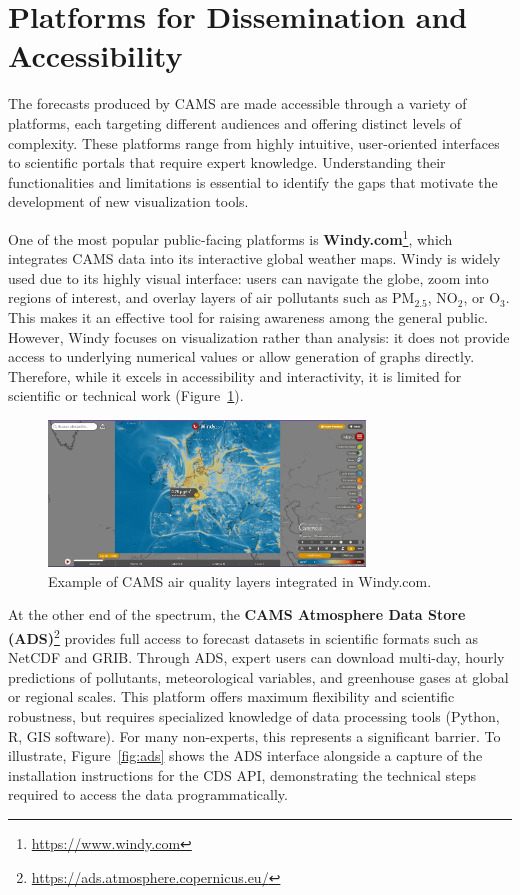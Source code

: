 \section{Platforms for Dissemination and Accessibility}

The forecasts produced by CAMS are made accessible through a variety of platforms, each targeting different audiences and offering distinct levels of complexity. These platforms range from highly intuitive, user-oriented interfaces to scientific portals that require expert knowledge. Understanding their functionalities and limitations is essential to identify the gaps that motivate the development of new visualization tools.

One of the most popular public-facing platforms is \textbf{Windy.com}\footnote{\href{https://www.windy.com}{https://www.windy.com}}, which integrates CAMS data into its interactive global weather maps. Windy is widely used due to its highly visual interface: users can navigate the globe, zoom into regions of interest, and overlay layers of air pollutants such as PM$_{2.5}$, NO$_2$, or O$_3$. This makes it an effective tool for raising awareness among the general public. However, Windy focuses on visualization rather than analysis: it does not provide access to underlying numerical values or allow generation of graphs directly. Therefore, while it excels in accessibility and interactivity, it is limited for scientific or technical work (Figure~\ref{fig:windy}).

\begin{figure}[h!btp]
	\centering
	\includegraphics[width=0.75\textwidth]{fig/windy-example.png}
	\caption[Windy.com interface]{Example of CAMS air quality layers integrated in Windy.com.}
	\label{fig:windy}
\end{figure}

At the other end of the spectrum, the \textbf{CAMS Atmosphere Data Store (ADS)}\footnote{\href{https://ads.atmosphere.copernicus.eu/}{https://ads.atmosphere.copernicus.eu/}} provides full access to forecast datasets in scientific formats such as NetCDF and GRIB. Through ADS, expert users can download multi-day, hourly predictions of pollutants, meteorological variables, and greenhouse gases at global or regional scales. This platform offers maximum flexibility and scientific robustness, but requires specialized knowledge of data processing tools (Python, R, GIS software). For many non-experts, this represents a significant barrier. To illustrate, Figure~\ref{fig:ads} shows the ADS interface alongside a capture of the installation instructions for the CDS API, demonstrating the technical steps required to access the data programmatically.


